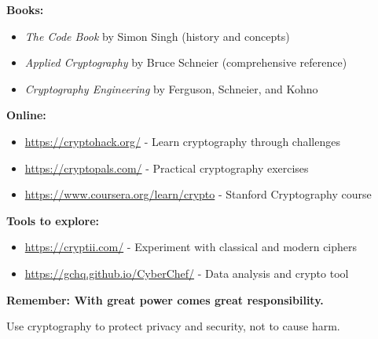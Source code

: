 \documentclass[11pt,a4paper]{report}
\begin{document}
\textbf{Books:}
\begin{itemize}
\item \emph{The Code Book} by Simon Singh (history and concepts)
\item \emph{Applied Cryptography} by Bruce Schneier (comprehensive reference)
\item \emph{Cryptography Engineering} by Ferguson, Schneier, and Kohno
\end{itemize}

\textbf{Online:}
\begin{itemize}
\item \url{https://cryptohack.org/} - Learn cryptography through challenges
\item \url{https://cryptopals.com/} - Practical cryptography exercises
\item \url{https://www.coursera.org/learn/crypto} - Stanford Cryptography course
\end{itemize}

\textbf{Tools to explore:}
\begin{itemize}
\item \url{https://cryptii.com/} - Experiment with classical and modern ciphers
\item \url{https://gchq.github.io/CyberChef/} - Data analysis and crypto tool
\end{itemize}

\vspace{1cm}

\begin{center}
\textbf{Remember: With great power comes great responsibility.}

Use cryptography to protect privacy and security, not to cause harm.
\end{center}

\newpage
\end{document}
